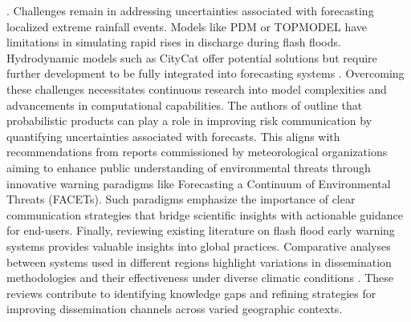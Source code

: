 \citep{Jubach2016}. Challenges remain in addressing uncertainties associated with forecasting localized extreme rainfall events. Models like PDM or TOPMODEL have limitations in simulating rapid rises in discharge during flash floods. Hydrodynamic models such as CityCat offer potential solutions but require further development to be fully integrated into forecasting systems \citep{Archer2024}. Overcoming these challenges necessitates continuous research into model complexities and advancements in computational capabilities. The authors of \citep{Martinaitis2023} outline that probabilistic products can play a role in improving risk communication by quantifying uncertainties associated with forecasts. This aligns with recommendations from reports commissioned by meteorological organizations aiming to enhance public understanding of environmental threats through innovative warning paradigms like Forecasting a Continuum of Environmental Threats (FACETs). Such paradigms emphasize the importance of clear communication strategies that bridge scientific insights with actionable guidance for end-users. Finally, reviewing existing literature on flash flood early warning systems provides valuable insights into global practices. Comparative analyses between systems used in different regions highlight variations in dissemination methodologies and their effectiveness under diverse climatic conditions \citep{Hinge2024}. These reviews contribute to identifying knowledge gaps and refining strategies for improving dissemination channels across varied geographic contexts.

